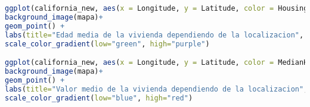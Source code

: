 \begin{lstlisting}[language=R]
ggplot(california_new, aes(x = Longitude, y = Latitude, color = HousingMedianAge))+
background_image(mapa)+
geom_point() +
labs(title="Edad media de la vivienda dependiendo de la localizacion", color="HousingMedianAge") +
scale_color_gradient(low="green", high="purple")

ggplot(california_new, aes(x = Longitude, y = Latitude, color = MedianHouseValue, hue = MedianHouseValue))+
background_image(mapa)+
geom_point() +
labs(title="Valor medio de la vivienda dependiendo de la localizacion", color="MedianHouseValue") +
scale_color_gradient(low="blue", high="red")
\end{lstlisting}












